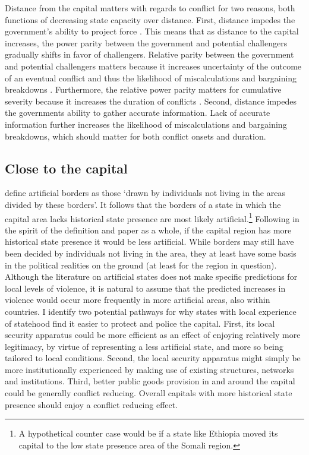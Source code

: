 \documentclass[12pt]{article}
\begin{document}
Distance from the capital matters with regards to conflict for two reasons, both
functions of decreasing state capacity over distance. First, distance impedes
the government's ability to project force \citep{Boulding1963, Buhaug_2010,
Buhaug2009, Herbst2014}. This means that as distance to the capital increases,
the power parity between the government and potential challengers gradually
shifts in favor of challengers. Relative parity between the government and
potential challengers matters because it increases uncertainty of the outcome of
an eventual conflict and thus the likelihood of miscalculations and bargaining
breakdowns \citep{Boulding1963, Buhaug_2010}. Furthermore, the relative power
parity matters for cumulative severity because it increases the duration of
conflicts \citep{Buhaug2009}. Second, distance impedes the governments ability
to gather accurate information. Lack of accurate information further increases
the likelihood of miscalculations and bargaining breakdowns, which should matter
for both conflict onsets and duration.

\subsection{Close to the capital} \label{Close}

\citet{Alesina2011} define artificial borders as those `drawn by individuals not
living in the areas divided by these borders'. It follows that the borders of a
state in which the capital area lacks historical state presence are most likely
artificial.\footnote{A hypothetical counter case would be if a state like
Ethiopia moved its capital to the low state presence area of the Somali region.}
Following in the spirit of the definition and paper as a whole, if the capital
region has more historical state presence it would be less artificial. While
borders may still have been decided by individuals not living in the area, they
at least have some basis in the political realities on the ground (at least for
the region in question). Although the literature on artificial states does not
make specific predictions for local levels of violence, it is natural to assume
that the predicted increases in violence would occur more frequently in more
artificial areas, also within countries. I identify two potential pathways for
why states with local experience of statehood find it easier to protect and
police the capital. First, its local security apparatus could be more efficient
as an effect of enjoying relatively more legitimacy, by virtue of representing a
less artificial state, and more so being tailored to local conditions. Second,
the local security apparatus might simply be more institutionally experienced by
making use of existing structures, networks and institutions. Third, better
public goods provision in and around the capital could be generally conflict
reducing. Overall capitals with more historical state presence should enjoy a
conflict reducing effect.
\end{document}
